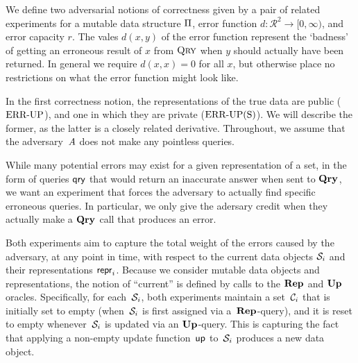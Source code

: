 


We define two adversarial notions of correctness given by a pair of related experiments for a mutable data structure $\mathrm{\Pi}$, error function $d: \mathcal{R}^2 \to [0,\infty)$, and error capacity $r$. The vales $d(x,y)$ of the error function represent the `badness' of getting an erroneous result of $x$ from $\textsc{Qry}$ when $y$ should actually have been returned. In general we require $d(x,x) = 0$ for all $x$, but otherwise place no restrictions on what the error function might look like.

In the first correctness notion, the representations of the true data are public ($\textnormal{ERR\mbox{-}UP}$), and one in which they are private ($\textnormal{ERR\mbox{-}UP(S)}$). We will describe the former, as the latter is a closely related derivative. Throughout, we assume that the adversary~$\mathit{A}$ does not make any pointless queries. 

While many potential errors may exist for a given representation of a set, in the form of queries $\mathsf{qry}$ that would return an inaccurate answer when sent to $\mathbf{Qry}\hspace{0.5pt}$, we want an experiment that forces the adversary to actually find specific erroneous queries. In particular, we only give the adersary credit when they actually make a $\mathbf{Qry}\hspace{0.5pt}$ call that produces an error.

Both experiments aim to capture the total weight of the errors caused by the adversary, at any point in time, with respect to the current data objects $\mathcal{S}_i$ and their representations $\mathsf{repr}_i$.  Because we consider mutable data objects and representations, the notion of ``current'' is defined by calls to the $\mathbf{Rep}\hspace{0.5pt}$ and $\mathbf{Up}\hspace{0.5pt}$ oracles.  Specifically, for each~$\mathcal{S}_i$, both experiments maintain a set~$\mathcal{C}_i$ that is initially set to empty (when~$\mathcal{S}_i$ is first assigned via a~$\mathbf{Rep}\hspace{0.5pt}$-query), and it is reset to empty whenever~$\mathcal{S}_i$ is updated via an $\mathbf{Up}\hspace{0.5pt}$-query.  This is capturing the fact that applying a non-empty update function~$\mathsf{up}$ to~$\mathcal{S}_i$ produces a new data object.

